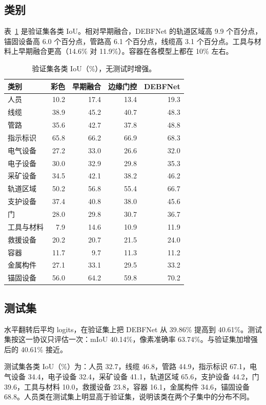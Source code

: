 \documentclass[11pt]{article}
\begin{document}
\subsection{类别}

表~\ref{tab:cls} 是验证集各类 IoU。相对早期融合，DEBFNet 的轨道区域高 9.9 个百分点，锚固设备高 6.0 个百分点，管路高 6.1 个百分点，线缆高 3.1 个百分点。工具与材料上早期融合更高（14.6\% 对 11.9\%）。容器在各模型上都在 10\% 左右。

\begin{table}[ht]
\centering
\caption{验证集各类 IoU（\%），无测试时增强。}
\label{tab:cls}
\small
\begin{tabular}{lrrrr}
\toprule
类别 & 彩色 & 早期融合 & 边缘门控 & DEBFNet \\
\midrule
人员 & 10.2 & 17.4 & 13.4 & 19.3 \\
线缆 & 38.9 & 45.2 & 40.7 & 48.3 \\
管路 & 35.6 & 42.7 & 37.8 & 48.8 \\
指示标识 & 65.8 & 66.2 & 66.9 & 68.3 \\
电气设备 & 27.2 & 33.0 & 26.6 & 32.0 \\
电子设备 & 30.0 & 32.9 & 29.8 & 35.3 \\
采矿设备 & 34.5 & 42.1 & 38.2 & 46.2 \\
轨道区域 & 50.2 & 56.8 & 55.4 & 66.7 \\
支护设备 & 37.4 & 40.8 & 38.0 & 45.6 \\
门 & 28.0 & 29.8 & 30.7 & 36.7 \\
工具与材料 & 7.9 & 14.6 & 10.9 & 11.9 \\
救援设备 & 20.2 & 20.7 & 21.5 & 24.0 \\
容器 & 11.7 & 9.7 & 11.3 & 11.2 \\
金属构件 & 27.1 & 33.1 & 29.5 & 33.2 \\
锚固设备 & 56.0 & 64.2 & 59.8 & 70.2 \\
\bottomrule
\end{tabular}
\end{table}

\subsection{测试集}

水平翻转后平均 logits，在验证集上把 DEBFNet 从 39.86\% 提高到 40.61\%。测试集按这一协议只评估一次：mIoU 40.14\%，像素准确率 63.74\%。与验证集加增强后的 40.61\% 接近。

测试集各类 IoU（\%）为：人员 32.7，线缆 46.8，管路 44.9，指示标识 67.1，电气设备 34.4，电子设备 32.4，采矿设备 41.1，轨道区域 65.6，支护设备 44.2，门 39.6，工具与材料 10.0，救援设备 23.8，容器 16.1，金属构件 34.6，锚固设备 68.8。人员类在测试集上明显高于验证集，说明该类在两个子集中的分布不同。
\end{document}
